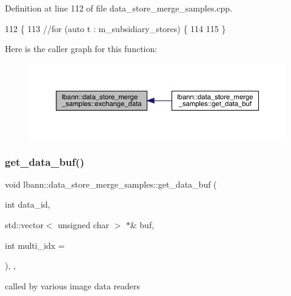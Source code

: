 Definition at line 112 of file data\+\_\+store\+\_\+merge\+\_\+samples.\+cpp.


\begin{DoxyCode}
112                                              \{
113   \textcolor{comment}{//for (auto t : m\_subsidiary\_stores) \{}
114     
115 \}
\end{DoxyCode}
Here is the caller graph for this function\+:\nopagebreak
\begin{figure}[H]
\begin{center}
\leavevmode
\includegraphics[width=350pt]{classlbann_1_1data__store__merge__samples_a89dc9b0e04c8279cee5e89be2f2ed2a3_icgraph}
\end{center}
\end{figure}
\mbox{\label{classlbann_1_1data__store__merge__samples_a8b81d947c1f05c38b7f979ce7e3cef97}} 
\subsubsection{\texorpdfstring{get\+\_\+data\+\_\+buf()}{get\_data\_buf()}}
{\footnotesize\ttfamily void lbann\+::data\+\_\+store\+\_\+merge\+\_\+samples\+::get\+\_\+data\+\_\+buf (\begin{DoxyParamCaption}\item[{int}]{data\+\_\+id,  }\item[{std\+::vector$<$ unsigned char $>$ $\ast$\&}]{buf,  }\item[{int}]{multi\+\_\+idx = {} }\end{DoxyParamCaption})\hspace{0.3cm}{\ttfamily [inline]}, {\ttfamily [override]}, {\ttfamily [virtual]}}



called by various image data readers 



